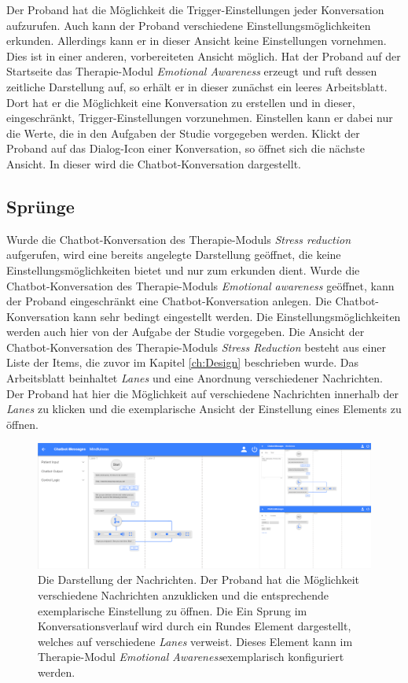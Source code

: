 Der Proband hat die Möglichkeit die Trigger-Einstellungen jeder Konversation aufzurufen. Auch kann der Proband verschiedene Einstellungsmöglichkeiten erkunden. Allerdings kann er in dieser Ansicht keine Einstellungen vornehmen. Dies ist in einer anderen, vorbereiteten Ansicht möglich. Hat der Proband auf der Startseite das Therapie-Modul \emph{Emotional Awareness} erzeugt und ruft dessen zeitliche Darstellung auf, so erhält er in dieser zunächst ein leeres Arbeitsblatt. Dort hat er die Möglichkeit eine Konversation zu erstellen und in dieser, eingeschränkt, Trigger-Einstellungen vorzunehmen. Einstellen kann er dabei nur die Werte, die in den Aufgaben der Studie vorgegeben werden. Klickt der Proband auf das Dialog-Icon einer Konversation, so öffnet sich die nächste Ansicht. In dieser wird die Chatbot-Konversation dargestellt. 

\subsection{Sprünge}
Wurde die Chatbot-Konversation des Therapie-Moduls \emph{Stress reduction} aufgerufen, wird eine bereits angelegte Darstellung geöffnet, die keine Einstellungsmöglichkeiten bietet und nur zum erkunden dient. Wurde die Chatbot-Konversation des Therapie-Moduls \emph{Emotional awareness} geöffnet, kann der Proband eingeschränkt eine Chatbot-Konversation anlegen. Die Chatbot-Konversation kann sehr bedingt eingestellt werden. Die Einstellungsmöglichkeiten werden auch hier von der Aufgabe der Studie vorgegeben. Die Ansicht der Chatbot-Konversation des Therapie-Moduls \emph{Stress Reduction} besteht aus einer Liste der Items, die zuvor im Kapitel \ref{ch:Design} beschrieben wurde. Das Arbeitsblatt beinhaltet \emph{Lanes} und eine Anordnung verschiedener Nachrichten. Der Proband hat hier die Möglichkeit auf verschiedene Nachrichten innerhalb der \emph{Lanes} zu klicken und die exemplarische Ansicht der Einstellung eines Elements zu öffnen.

\begin{figure}[h]
\centering
\includegraphics[width=1\textwidth]{pictures/textset}
\caption{Die Darstellung der Nachrichten. Der Proband hat die Möglichkeit verschiedene Nachrichten anzuklicken und die entsprechende exemplarische Einstellung zu öffnen. Die Ein Sprung im Konversationsverlauf wird durch ein Rundes Element dargestellt, welches auf verschiedene \emph{Lanes} verweist. Dieses Element kann im Therapie-Modul \emph{Emotional Awareness}exemplarisch konfiguriert werden.} 
\label{textset}
\end{figure}

